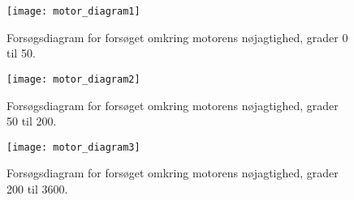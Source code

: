 \begin{figure}[h]
\centering
\texttt{[image: motor\_diagram1]} 	
\caption{Forsøgsdiagram for forsøget omkring motorens nøjagtighed, grader 0 til 50.}
\label{sensor:motor_sensor_diagram1}
\end{figure}

\begin{figure}[h]
\centering
\texttt{[image: motor\_diagram2]} 	
\caption{Forsøgsdiagram for forsøget omkring motorens nøjagtighed, grader 50 til 200.}
\label{sensor:motor_sensor_diagram2}
\end{figure}

\begin{figure}[h]
\centering
\texttt{[image: motor\_diagram3]} 	
\caption{Forsøgsdiagram for forsøget omkring motorens nøjagtighed, grader 200 til 3600.}
\label{sensor:motor_sensor_diagram3}
\end{figure}